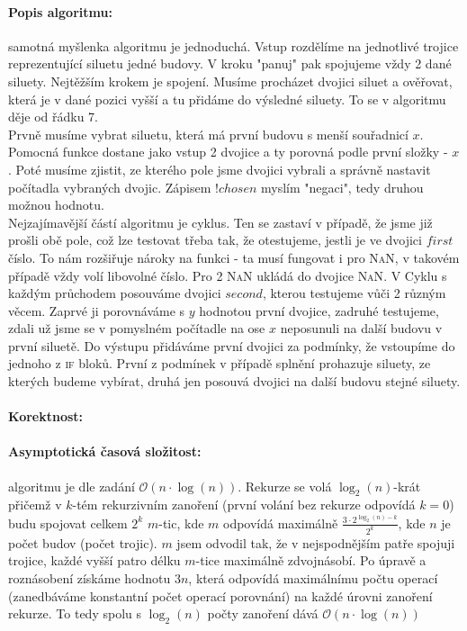 \documentclass[12pt]{iv003}
\begin{document}
\paragraph{Popis algoritmu:} samotná myšlenka algoritmu je jednoduchá. Vstup rozdělíme na jednotlivé trojice reprezentující siluetu jedné budovy. V kroku "panuj" pak spojujeme vždy 2 dané siluety. Nejtěžším krokem je spojení. Musíme procházet dvojici siluet a ověřovat, která je v dané pozici vyšší a tu přidáme do výsledné siluety. To se v algoritmu děje od řádku 7.\\
Prvně musíme vybrat siluetu, která má první budovu s menší souřadnicí $x$. Pomocná funkce \ffmin dostane jako vstup 2 dvojice a ty porovná podle první složky - $x$. Poté musíme zjistit, ze kterého pole jsme dvojici vybrali a správně nastavit počítadla vybraných dvojic. Zápisem $!chosen$ myslím "negaci", tedy druhou možnou hodnotu.\\
Nejzajímavější částí algoritmu je cyklus. Ten se zastaví v případě, že jsme již prošli obě pole, což lze testovat třeba tak, že otestujeme, jestli je ve dvojici $first$ číslo. To nám rozšiřuje nároky na funkci \ffmin - ta musí fungovat i pro \textsc{NaN}, v takovém případě vždy volí libovolné číslo. Pro 2 \textsc{NaN} ukládá do dvojice \textsc{NaN}. V Cyklu s každým průchodem posouváme dvojici $second$, kterou testujeme vůči 2 různým věcem. Zaprvé ji porovnáváme s $y$ hodnotou první dvojice, zadruhé testujeme, zdali už jsme se v pomyslném počítadle na ose $x$ neposunuli na další budovu v první siluetě. Do výstupu přidáváme první dvojici za podmínky, že vstoupíme do jednoho z \textsc{if} bloků. První z podmínek v případě splnění prohazuje siluety, ze kterých budeme vybírat, druhá jen posouvá dvojici na další budovu stejné siluety.
\paragraph{Korektnost:} 
\paragraph{Asymptotická časová složitost:} algoritmu je dle zadání $\mathcal{O}(n\cdot\log(n))$. Rekurze se volá $\log_{2}(n)$-krát přičemž v $k$-tém rekurzivním zanoření (první volání bez rekurze odpovídá $k=0$) budu spojovat celkem $2^{k}$ $m$-tic, kde $m$ odpovídá maximálně $\frac{3\cdot 2^{\log_{2}(n)-k}}{2^{k}}$, kde $n$ je počet budov (počet trojic). $m$ jsem odvodil tak, že v nejspodnějším patře spojuji trojice, každé vyšší patro délku $m$-tice maximálně zdvojnásobí. Po úpravě a roznásobení získáme hodnotu $3n$, která odpovídá maximálnímu počtu operací (zanedbáváme konstantní počet operací porovnání) na každé úrovni zanoření rekurze. To tedy spolu s $\log_{2}(n)$ počty zanoření dává $\mathcal{O}(n\cdot\log(n))$
\end{document}
